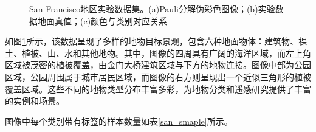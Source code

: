 \begin{figure}[ht]
    \quad
    \quad
    \caption{San Francisco地区实验数据集。(a)Pauli分解伪彩色图像；(b)实验数据地面真值；(c)颜色与类别对应关系}
    \label{San}
\end{figure}

如图\ref{San}所示，该数据呈现了多样的地物目标景观，包含六种地面物体：建筑物、裸土、植被、山、水和其他地物。其中，图像的四周具有广阔的海洋区域，而左上角区域被茂密的植被覆盖，由金门大桥建筑区域与下方的地物连接。图像中部为公园区域，公园周围属于城市居民区域，而图像的右方则呈现出一个近似三角形的植被覆盖区域。这些不同的地物类型分布丰富多彩，为地物分类和遥感研究提供了丰富的实例和场景。

图像中每个类别带有标签的样本数量如表\ref{san_smaple}所示。

